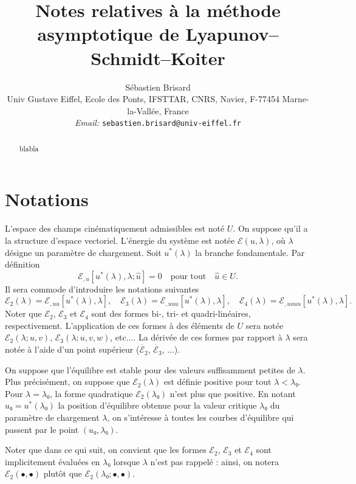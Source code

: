 \documentclass{article}
\newcommand{\tmaffiliation}[1]{\\ #1}
\newcommand{\tmemail}[1]{\\ \textit{Email:} \texttt{#1}}
\begin{document}
\title{Notes relatives à la méthode asymptotique de
Lyapunov--Schmidt--Koiter}

\author{
  Sébastien Brisard
  \tmaffiliation{Univ Gustave Eiffel, Ecole des Ponts, IFSTTAR, CNRS, Navier,
  F-77454 Marne-la-Vallée, France}
  \tmemail{sebastien.brisard@univ-eiffel.fr}
}

\maketitle

\begin{abstract}
  blabla
\end{abstract}

\section{Notations}

L'espace des champs cinématiquement admissibles est noté $U$. On
suppose qu'il a la structure d'espace vectoriel. L'énergie du système
est notée $ℰ (u, λ)$, où $λ$ désigne un
paramètre de chargement. Soit $u^{\ast} (λ)$ la branche
fondamentale. Par définition
\begin{equation}
  ℰ_{, u} [u^{\ast} (λ), λ ; \hat{u}] = 0 \quad
  \text{pour tout} \quad \hat{u}∈U.
\end{equation}
Il sera commode d'introduire les notations suivantes
\begin{equation}
  ℰ_2 (λ) =ℰ_{, u  u}  [u^{\ast} (λ),
  λ], \quad ℰ_3 (λ) =ℰ_{, u  u
   u} [u^{\ast} (λ), λ], \quad ℰ_4 (λ)
  =ℰ_{, u  u  u  u} [u^{\ast} (λ),
  λ] .
\end{equation}
Noter que $ℰ_2$, $ℰ_3$ et $ℰ_4$ sont des formes
bi-, tri- et quadri-linéaires, respectivement. L'application de ces formes
à des éléments de $U$ sera notée $ℰ_2 (λ ; u,
v)$, $ℰ_3 (λ ; u, v, w)$, etc.... La dérivée de ces
formes par rapport à $λ$ sera notée à l'aide d'un point
supérieur ($\dot{ℰ_2}$, $\dot{ℰ_3}$, ...).

On suppose que l'équilibre est stable pour des valeurs suffisamment
petites de $λ$. Plus précisément, on suppose que $ℰ_2
(λ)$ est définie positive pour tout $λ < λ₀$. Pour
$λ = λ₀$, la forme quadratique $ℰ_2 (λ₀)$ n'est
plus que positive. En notant $u₀ = u^{\ast} (λ₀)$ la position
d'équilibre obtenue pour la valeur critique $λ₀$ du paramètre
de chargement $λ$, on s'intéresse à toutes les courbes
d'équilibre qui passent par le point $(u₀, λ₀)$.

Noter que dans ce qui suit, on convient que les formes $ℰ_2$,
$ℰ_3$ et $ℰ_4$ sont implicitement évaluées en
$λ₀$ lorsque $λ$ n'est pas rappelé : ainsi, on notera
$ℰ_2 (\bullet, \bullet)$ plutôt que $ℰ_2 (λ₀ ;
\bullet, \bullet)$.
\end{document}
